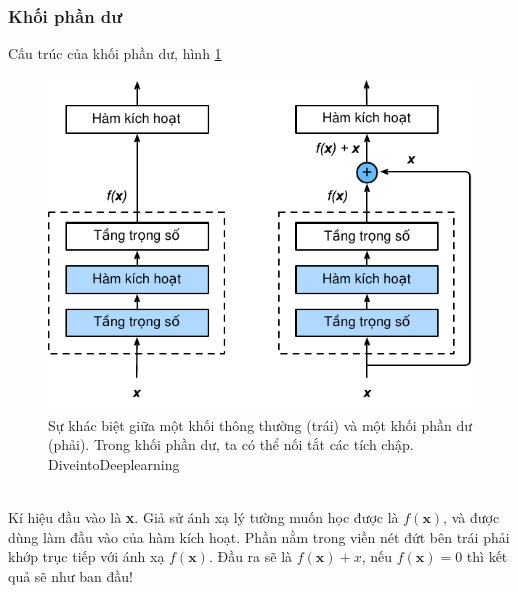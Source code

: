 \documentclass{article}
\begin{document}
\subsubsection{Khối phần dư}
Cấu trúc của khối phần dư, hình \ref{fig15}
\begin{figure}
    \centering
    \includegraphics[width = 0.6\linewidth]{residual-block.pdf}
    \caption{Sự khác biệt giữa một khối thông thường (trái) và một khối phần dư (phải). Trong khối phần dư, ta có thể nối tắt các tích chập. DiveintoDeeplearning}
    \label{fig15}
\end{figure}
\phantom{a}\\
Kí hiệu đầu vào là \textbf{x}. Giả sử ánh xạ lý tường muốn học được là $f(\textbf{x})$, và được dùng làm đầu vào của hàm kích hoạt. Phần nằm trong viền nét đứt bên trái phải khớp trục tiếp với ánh xạ $f(\textbf{x})$. Đầu ra sẽ là $f(\textbf{x})+x$, nếu $f(\textbf{x}) = 0$ thì kết quả sẽ như ban đầu!
\end{document}
